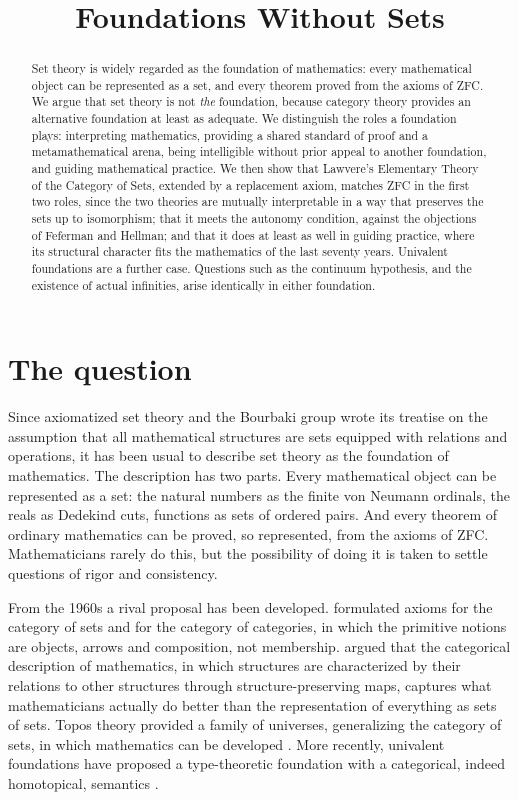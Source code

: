\documentclass{situationist-preprint}
\title{Foundations Without Sets}
\begin{document}
\maketitle

\begin{abstract}
Set theory is widely regarded as the foundation of mathematics: every mathematical object can be represented as a set, and every theorem proved from the axioms of ZFC. We argue that set theory is not \emph{the} foundation, because category theory provides an alternative foundation at least as adequate. We distinguish the roles a foundation plays: interpreting mathematics, providing a shared standard of proof and a metamathematical arena, being intelligible without prior appeal to another foundation, and guiding mathematical practice. We then show that Lawvere's Elementary Theory of the Category of Sets, extended by a replacement axiom, matches ZFC in the first two roles, since the two theories are mutually interpretable in a way that preserves the sets up to isomorphism; that it meets the autonomy condition, against the objections of Feferman and Hellman; and that it does at least as well in guiding practice, where its structural character fits the mathematics of the last seventy years. Univalent foundations are a further case. Questions such as the continuum hypothesis, and the existence of actual infinities, arise identically in either foundation.
\end{abstract}

\section{The question}\label{s:question}

Since \citet{Zermelo1908} axiomatized set theory and the Bourbaki group wrote its treatise on the assumption that all mathematical structures are sets equipped with relations and operations, it has been usual to describe set theory as the foundation of mathematics. The description has two parts. Every mathematical object can be represented as a set: the natural numbers as the finite von Neumann ordinals, the reals as Dedekind cuts, functions as sets of ordered pairs. And every theorem of ordinary mathematics can be proved, so represented, from the axioms of ZFC. Mathematicians rarely do this, but the possibility of doing it is taken to settle questions of rigor and consistency.

From the 1960s a rival proposal has been developed. \citet{Lawvere1964,Lawvere1966} formulated axioms for the category of sets and for the category of categories, in which the primitive notions are objects, arrows and composition, not membership. \citet{MacLane1986} argued that the categorical description of mathematics, in which structures are characterized by their relations to other structures through structure-preserving maps, captures what mathematicians actually do better than the representation of everything as sets of sets. Topos theory provided a family of universes, generalizing the category of sets, in which mathematics can be developed \citep{MacLaneMoerdijk1992}. More recently, univalent foundations have proposed a type-theoretic foundation with a categorical, indeed homotopical, semantics \citep{UFP2013}.
\end{document}
